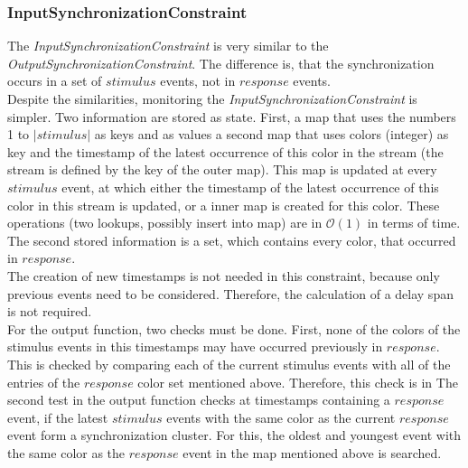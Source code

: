 \subsubsection{InputSynchronizationConstraint}
	The \emph{InputSynchronizationConstraint} is very similar to the \emph{OutputSynchronizationConstraint}. The difference is, that the synchronization occurs in a set of $stimulus$ events, not in $response$ events.\\
	Despite the similarities, monitoring the \emph{InputSynchronizationConstraint} is simpler. Two information are stored as state. First, a map that uses the numbers 1 to $|stimulus|$ as keys and as values a second map that uses colors (integer) as key and the timestamp of the latest occurrence of this color in the stream (the stream is defined by the key of the outer map). This map is updated at every $stimulus$ event, at which either the timestamp of the latest occurrence of this color in this stream is updated, or a inner map is created for this color. These operations (two lookups, possibly insert into map) are in $\mathcal{O}(1)$ in terms of time.\\
	The second stored information is a set, which contains every color, that occurred in $response$.\\
	The creation of new timestamps is not needed in this constraint, because only previous events need to be considered. Therefore, the calculation of a delay span is not required.\\
	For the output function, two checks must be done. First, none of the colors of the stimulus events in this timestamps may have occurred previously in $response$. This is checked by comparing each of the current stimulus events with all of the entries of the $response$ color set mentioned above. Therefore, this check is in %
	The second test in the output function checks at timestamps containing a $response$ event, if the latest $stimulus$ events with the same color as the current $response$ event form a synchronization cluster. For this, the oldest and youngest event with the same color as the $response$ event in the map mentioned above is searched. %
	
	
	

	
	
